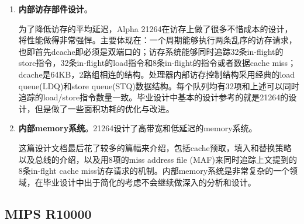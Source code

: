 \begin{enumerate}[label=(\alph*)]
		\item \textbf{内部访存部件设计}。
		
		为了降低访存的平均延迟，Alpha 21264在访存上做了很多不惜成本的设计，将性能做得非常强悍。主要体现在：一个周期能够执行两条乱序的访存请求，也即首先dcache即必须是双端口的；访存系统能够同时追踪32条in-flight的store指令，32条in-flight的load指令和8条in-flight的指令或者数据cache miss；dcache是64KB，2路组相连的结构\citep{Alpha21264}。处理器内部访存控制结构采用经典的load queue(LDQ)和store queue(STQ)数据结构。每个队列均有32项和上述可以同时追踪的load/store指令数量一致\citep{Alpha21264}。毕业设计中基本的设计参考的就是21264的设计，但是做了一些面积功耗的优化与改进。
		\item \textbf{内部memory系统}。21264设计了高带宽和低延迟的memory系统。
		
		这篇设计文档最后花了较多的篇幅来介绍，包括cache预取，填入和替换策略以及总线的介绍，以及用8项的miss address file (MAF)来同时追踪上文提到的8条in-flght cache miss访存请求的机制。内部memory系统是非常复杂的一个领域，在毕业设计中出于简化的考虑不会继续做深入的分析和设计。
	\end{enumerate}
	
	\subsection{MIPS R10000}\label{subsec:r10000}
	
